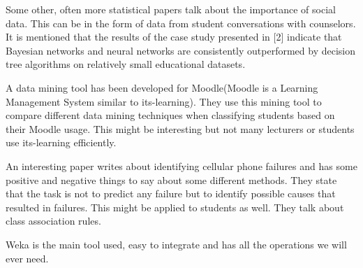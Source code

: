 Some other, often more statistical papers talk about the importance of social data. This can be in the form of data from student conversations with counselors\cite{11}. It is mentioned that the results of the case study presented in [2] indicate that Bayesian networks and neural networks are consistently outperformed by decision tree algorithms on relatively small educational datasets.

A data mining tool has been developed for Moodle(Moodle is a Learning Management System similar to its-learning)\cite{12}. They use this mining tool to compare different data mining techniques when classifying students based on their Moodle usage. This might be interesting but not many lecturers or students use its-learning efficiently. 

An interesting paper writes about identifying cellular phone failures and has some positive and negative things to say about some different methods\cite{13}. They state that the task is not to predict any failure but to identify possible causes that resulted in failures. This might be applied to students as well. They talk about class association rules.

Weka is the main tool used, easy to integrate and has all the operations we will ever need.

